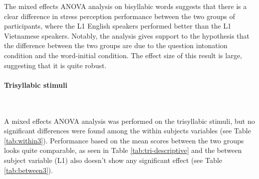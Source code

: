 \documentclass[a4paper]{article}
\begin{document}
The mixed effects ANOVA analysis on bisyllabic words suggests that there is a clear difference in stress perception performance between the two groups of participants, where the L1 English speakers performed better than the L1 Vietnamese speakers. Notably, the analysis gives support to the hypothesis that the difference between the two groups are due to the question intonation condition and the word-initial condition. The effect size of this result is large, suggesting that it is quite robust. 

\paragraph{Trisyllabic stimuli} \

A mixed effects ANOVA analysis was performed on the trisyllabic stimuli, but no significant differences were found among the within subjects variables (see Table \ref{tab:within3}). Performance based on the mean scores between the two groups looks quite comparable, as seen in Table \ref{tab:tri-descriptive} and the between subject variable (L1) also doesn't show any significant effect (see Table \ref{tab:between3}).

\end{document}
